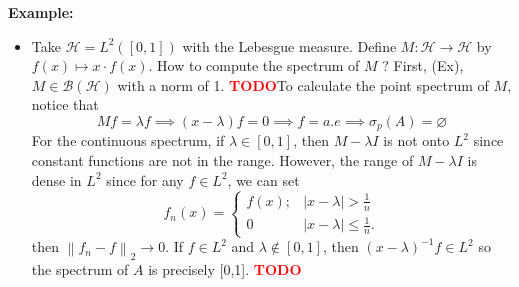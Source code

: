 \documentclass{article}
\newcommand{\B}{\mathcal{B}}
\renewcommand{\H}{\mathcal{H}}
\newcommand{\lnorm}[2]{\left\lVert#2 \right\rVert_{#1}}
\newcommand{\td}{\textcolor{red}{\textbf{TODO}}}
\newenvironment{example}{\noindent\textbf{Example:} \vspace{-0.2cm}\begin{itemize}}{\end{itemize}}
\begin{document}
\begin{example}
    \item Take $\H = L^2([0,1])$ with the Lebesgue measure. Define $M : \H \to \H$ by $f(x) \mapsto x\cdot f(x)$. How to compute the spectrum of $M$ ? First, (Ex), $M \in \B(\H)$ with a norm of 1. \td To calculate the point spectrum of $M$, notice that
    $$Mf = \lambda f \implies (x - \lambda)f = 0 \implies f = a.e \implies \sigma_p(A) = \varnothing$$
    For the continuous spectrum, if $\lambda \in [0,1]$, then $M-\lambda I$ is not onto $L^2$ since constant functions are not in the range. However, the range of $M - \lambda I$ is dense in $L^2$ since for any $f \in L^2$, we can set
    $$f_n(x) = \begin{cases}
        f(x); & |x - \lambda| > \frac{1}{n} \\ 0 & |x - \lambda| \leq \frac{1}{n}.
    \end{cases}$$
    then $\lnorm{2}{f_n - f} \rightarrow 0$. If $f \in L^2$ and $\lambda \notin [0,1]$, then $(x - \lambda)^{-1}f \in L^2$ so the spectrum of $A$ is precisely [0,1]. \td 
\end{example}
\end{document}
